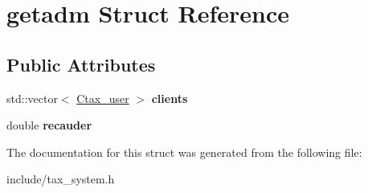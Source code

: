 \hypertarget{structgetadm}{\section{getadm Struct Reference}
\label{structgetadm}
}
\subsection*{Public Attributes}
\begin{DoxyCompactItemize}
\item 
\hypertarget{structgetadm_a1bf1db229e8d544332311583a34490ac}{std\+::vector$<$ \hyperlink{class_ctax__user}{Ctax\+\_\+user} $>$ {\bfseries clients}}\label{structgetadm_a1bf1db229e8d544332311583a34490ac}

\item 
\hypertarget{structgetadm_a7b95ab57b26c1107038a6f9987ab890d}{double {\bfseries recauder}}\label{structgetadm_a7b95ab57b26c1107038a6f9987ab890d}

\end{DoxyCompactItemize}


The documentation for this struct was generated from the following file\+:\begin{DoxyCompactItemize}
\item 
include/tax\+\_\+system.\+h\end{DoxyCompactItemize}
